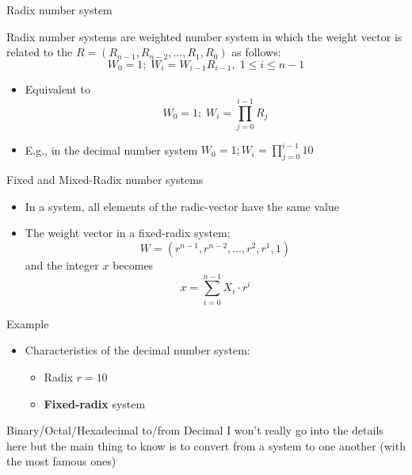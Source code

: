 \begin{parag}{Radix number system}
    \begin{definition}
        Radix number systems are weighted number system in which the weight vector is related to the  $R = (R_{n-1}, R_{n-2}, \dots, R_1, R_0)$ as follows:
        \[W_0 = 1; \; W_i = W_{i-1}R_{i-1}, \; 1 \leq i \leq n-1\]
    \end{definition}
    \begin{itemize}
        \item Equivalent to
        \[W_0 = 1; \; W_i = \prod_{j=0}^{i-1} R_j\]
        \item E.g., in the decimal number system $W_0 = 1; W_i = \prod_{j = 0}^{i-1} 10$
    \end{itemize}
    \begin{subparag}{Fixed and Mixed-Radix number systems}
        \begin{itemize}
            \item In a  system, all elements of the radic-vector have the same value 
            \item The weight vector in a fixed-radix system:
            \[W = (r^{n-1}, r^{n-2}, \dots, r^2, r^1, 1)\]
            and the integer $x$ becomes 
            \[x = \sum_{i = 0}^{n-1} X_i \cdot r^i\]
        \end{itemize}
    \end{subparag}
    \begin{subparag}{Example}
        \begin{itemize}
            \item Characteristics of the decimal number system:
            \begin{itemize}
                \item Radix $r = 10$
                \item \textbf{Fixed-radix} system
            \end{itemize}
        \end{itemize}
    \end{subparag}
\end{parag}
\begin{parag}{Binary/Octal/Hexadecimal to/from Decimal}
I won't really go into the details here but the main thing to know is to convert from a system to one another (with the most famous ones)
\end{parag}
